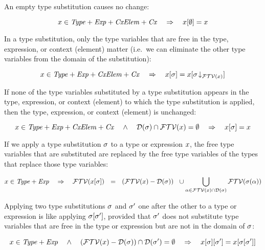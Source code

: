 An empty type substitution causes no change:
\begin{theorem}\label{thm-tsbs-id}
\[
x\in\mathit{Type}+\mathit{Exp}+\mathit{CxElem}+\mathit{Cx}
\ \ \ \Rightarrow\ \ \
x[\emptyset]=x
\]
\end{theorem}

In a type substitution, only the type variables that are free in the type,
expression, or context (element) matter (i.e.\ we can eliminate the other type
variables from the domain of the substitution):

\begin{theorem}\label{thm-tsbs-ftvar}
\[
x\in\mathit{Type}+\mathit{Exp}+\mathit{CxElem}+\mathit{Cx}
\ \ \ \Rightarrow\ \ \
x[\sigma]=x[\sigma\!\downarrow_{\mathcal{FTV}(x)}]
\]
\end{theorem}

If none of the type variables substituted by a type substitution appears in
the type, expression, or context (element) to which the type substitution is
applied, then the type, expression, or context (element) is unchanged:

\begin{theorem}\label{thm-tsbs-not-free}
\[
x\in\mathit{Type}+\mathit{Exp}+\mathit{CxElem}+\mathit{Cx}
\ \ \ \wedge\ \ \
\mathcal{D}(\sigma)\cap\mathcal{FTV}(x)=\emptyset
\ \ \ \Rightarrow\ \ \
x[\sigma]=x
\]
\end{theorem}

If we apply a type substitution $\sigma$ to a type or expression $x$, the
free type variables that are substituted are replaced by the free type
variables of the types that replace those type variables:

\begin{theorem}\label{thm-ftvar-of-tsbs}
\[
x\in\mathit{Type}+\mathit{Exp}
\ \ \ \Rightarrow\ \ \
\mathcal{FTV}(x[\sigma])
\ \ =\ \
(\mathcal{FTV}(x)-\mathcal{D}(\sigma))
\ \ \cup
\bigcup_{\alpha\in\mathcal{FTV}(x)\cap\mathcal{D}(\sigma)}\mathcal{FTV}(\sigma(\alpha))
\]
\end{theorem}

Applying two type substitutions $\sigma$ and $\sigma'$ one after the other
to a type or expression is like applying $\sigma[\sigma']$,
provided that $\sigma'$ does not substitute type variables that are free in
the type or expression but are not in the domain of $\sigma$:

\begin{theorem}\label{thm-tsbs-tsbs}
\[
x\in\mathit{Type}+\mathit{Exp}
\ \ \ \wedge\ \ \
(\mathcal{FTV}(x)-\mathcal{D}(\sigma))\cap\mathcal{D}(\sigma')=\emptyset
\ \ \ \Rightarrow\ \ \
x[\sigma][\sigma'] =
x[\sigma[\sigma']]
\]
\end{theorem}

